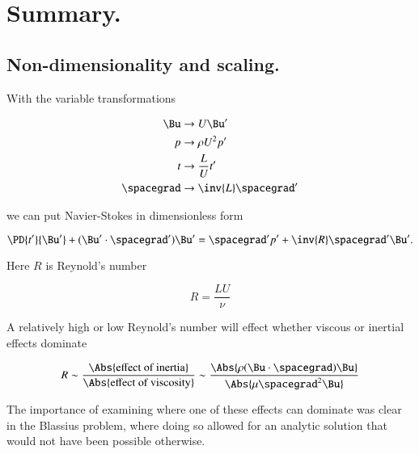 \section{Summary.}
\subsection{Non-dimensionality and scaling.}

With the variable transformations

\begin{align}\label{eqn:continuumFluidsReview:2150}
\Bu &\rightarrow U \Bu' \\
p &\rightarrow \rho U^2 p' \\
t &\rightarrow \frac{L}{U} t' \\
\spacegrad &\rightarrow \inv{L} \spacegrad'
\end{align}

we can put Navier-Stokes in dimensionless form

\begin{equation}\label{eqn:continuumFluidsReview:2170}
\PD{t'}{\Bu'} + (\Bu' \cdot \spacegrad') \Bu' = \spacegrad' p' + \inv{R} \spacegrad' \Bu'.
\end{equation}

Here $R$ is Reynold's number

\begin{equation}\label{eqn:continuumFluidsReview:2190}
R = \frac{L U}{\nu}
\end{equation}

A relatively high or low Reynold's number will effect whether viscous or inertial effects dominate

\begin{equation}\label{eqn:continuumFluidsReview:2210}
R 
\sim \frac{\Abs{\text{effect of inertia}}}{\Abs{\text{effect of viscosity}}} 
\sim 
\frac{ \Abs{\rho ( \Bu \cdot \spacegrad ) \Bu } }{\Abs{ \mu \spacegrad^2 \Bu}}
\end{equation}

The importance of examining where one of these effects can dominate was clear in the Blassius problem, where doing so allowed for an analytic solution that would not have been possible otherwise.

